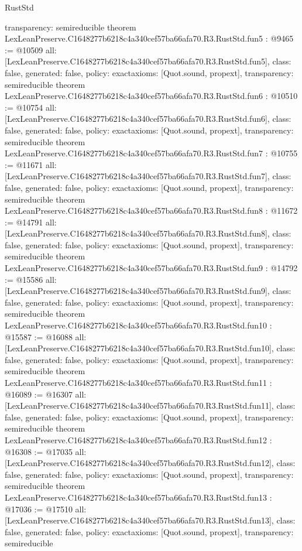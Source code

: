 \begin{lexlean}{RustStd}
\begin{coremodule}
{  transparency: semireducible
}
theorem LexLeanPreserve.C1648277b6218c4a340cef57ba66afa70.R3.RustStd.fun5 : @9465 := @10509 {
  all: [LexLeanPreserve.C1648277b6218c4a340cef57ba66afa70.R3.RustStd.fun5],
  class: false,
  generated: false,
  policy: exact{axioms: [Quot.sound, propext]},
  transparency: semireducible
}
theorem LexLeanPreserve.C1648277b6218c4a340cef57ba66afa70.R3.RustStd.fun6 : @10510 := @10754 {
  all: [LexLeanPreserve.C1648277b6218c4a340cef57ba66afa70.R3.RustStd.fun6],
  class: false,
  generated: false,
  policy: exact{axioms: [Quot.sound, propext]},
  transparency: semireducible
}
theorem LexLeanPreserve.C1648277b6218c4a340cef57ba66afa70.R3.RustStd.fun7 : @10755 := @11671 {
  all: [LexLeanPreserve.C1648277b6218c4a340cef57ba66afa70.R3.RustStd.fun7],
  class: false,
  generated: false,
  policy: exact{axioms: [Quot.sound, propext]},
  transparency: semireducible
}
theorem LexLeanPreserve.C1648277b6218c4a340cef57ba66afa70.R3.RustStd.fun8 : @11672 := @14791 {
  all: [LexLeanPreserve.C1648277b6218c4a340cef57ba66afa70.R3.RustStd.fun8],
  class: false,
  generated: false,
  policy: exact{axioms: [Quot.sound, propext]},
  transparency: semireducible
}
theorem LexLeanPreserve.C1648277b6218c4a340cef57ba66afa70.R3.RustStd.fun9 : @14792 := @15586 {
  all: [LexLeanPreserve.C1648277b6218c4a340cef57ba66afa70.R3.RustStd.fun9],
  class: false,
  generated: false,
  policy: exact{axioms: [Quot.sound, propext]},
  transparency: semireducible
}
theorem LexLeanPreserve.C1648277b6218c4a340cef57ba66afa70.R3.RustStd.fun10 : @15587 := @16088 {
  all: [LexLeanPreserve.C1648277b6218c4a340cef57ba66afa70.R3.RustStd.fun10],
  class: false,
  generated: false,
  policy: exact{axioms: [Quot.sound, propext]},
  transparency: semireducible
}
theorem LexLeanPreserve.C1648277b6218c4a340cef57ba66afa70.R3.RustStd.fun11 : @16089 := @16307 {
  all: [LexLeanPreserve.C1648277b6218c4a340cef57ba66afa70.R3.RustStd.fun11],
  class: false,
  generated: false,
  policy: exact{axioms: [Quot.sound, propext]},
  transparency: semireducible
}
theorem LexLeanPreserve.C1648277b6218c4a340cef57ba66afa70.R3.RustStd.fun12 : @16308 := @17035 {
  all: [LexLeanPreserve.C1648277b6218c4a340cef57ba66afa70.R3.RustStd.fun12],
  class: false,
  generated: false,
  policy: exact{axioms: [Quot.sound, propext]},
  transparency: semireducible
}
theorem LexLeanPreserve.C1648277b6218c4a340cef57ba66afa70.R3.RustStd.fun13 : @17036 := @17510 {
  all: [LexLeanPreserve.C1648277b6218c4a340cef57ba66afa70.R3.RustStd.fun13],
  class: false,
  generated: false,
  policy: exact{axioms: [Quot.sound, propext]},
  transparency: semireducible
}
\end{coremodule}
\end{lexlean}
